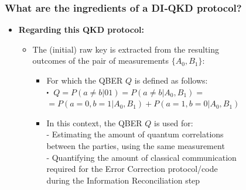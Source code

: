 \documentclass{beamer}
\newcommand\sbullet[1][.5]{\mathbin{\vcenter{\hbox{\scalebox{#1}{$\bullet$}}}}}
\begin{document}
		\begin{frame}
			\frametitle{\large What are the ingredients of a DI‑QKD protocol?}
   
            \begin{itemize}
                \item \textbf{Regarding this QKD protocol:}
                \begin{itemize}
                    \item The (initial) raw key is extracted from the resulting\\ outcomes of the pair of measurements $\{{A}_{0}, {B}_{1}\}$:
                    \begin{itemize}
                        \item For which the QBER $Q$ is defined as follows:\\
                        $\sbullet$\, $Q = P(a \neq b | 01) = P(a \neq b | {A}_{0}, {B}_{1}) =$\\
                        \hspace{1.4em}$= P(a = 0, b = 1 | {A}_{0}, {B}_{1}) + P(a = 1, b = 0 | {A}_{0}, {B}_{1})$\\
                        \vspace{1ex}
                        \item In this context, the QBER $Q$ is used for:\\
                        \footnotesize
                        - Estimating the amount of quantum correlations\\
                        \hspace{0.5em}between the parties, using the same measurement\\
                        - Quantifying the amount of classical communication\\\hspace{0.5em}required for the Error Correction protocol/code\\\hspace{0.5em}during the Information Reconciliation step 
                    \end{itemize}
                \end{itemize}
            \end{itemize}
		\end{frame}
\end{document}

